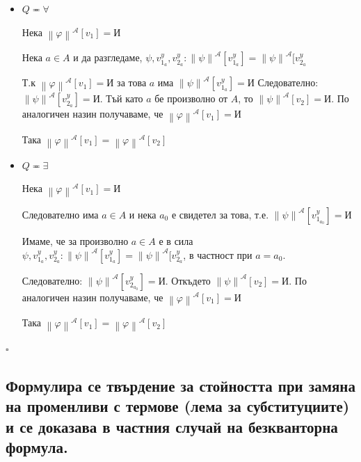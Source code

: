 \documentclass{article}
\renewcommand{\\}{\newline}
\newcommand{\I}{\text{И}}
\newcommand{\proven}{\hfill $\square$}
\begin{document}
\begin{itemize}
    \item \(Q \eqcirc \forall\) 

      Нека \(\left\|\varphi\right\|^{\mathcal{A}}[v_1] = \I\) 

      Нека \(a \in A\) и да разгледаме, \(\psi, v_{1_a}^{y}, v_{2_a}^{y}: \left\|\psi\right\|^{\mathcal{A}}[v_{1_a}^{y}] = \left\|\psi\right\|^{\mathcal{A}}[v_{2_a}^{y}\)   

      Т.к \(\left\|\varphi\right\|^{\mathcal{A}}[v_1] = \I\) за това \(a\) има \(\left\|\psi\right\|^{\mathcal{A}}[v_{1_a}^{y}] =\I\) 
      Следователно: \(\left\|\psi\right\|^{\mathcal{A}}[v_{2_a}^{y}] =\I\). Тъй като \(a\) бе произволно от \(A\), то \(\left\|\psi\right\|^{\mathcal{A}}[v_2] = \I\). По аналогичен назин получаваме, че \(\left\|\varphi\right\|^{\mathcal{A}}[v_1] = \I\)

      Така \(\left\|\varphi\right\|^{\mathcal{A}}[v_1] = \left\|\varphi\right\|^{\mathcal{A}}[v_2]\)  



    \item \(Q \eqcirc \exists\)  

      Нека \(\left\|\varphi\right\|^{\mathcal{A}}[v_1] = \I\) 

      Следователно има \(a \in A\) и нека \(a_0\) е свидетел за това, т.е. \(\left\|\psi\right\|^{\mathcal{A}}[v_{1_{a_0}}^{y}] =\I\)

      Имаме, че за произволно \(a \in A\) е в сила \(\psi, v_{1_a}^{y}, v_{2_a}^{y}: \left\|\psi\right\|^{\mathcal{A}}[v_{1_a}^{y}] = \left\|\psi\right\|^{\mathcal{A}}[v_{2_a}^{y}\), в частност при \(a = a_0\).  

      Следователно: \(\left\|\psi\right\|^{\mathcal{A}}[v_{2_{a_0}}^{y}] =\I\). Откъдето \(\left\|\psi\right\|^{\mathcal{A}}[v_2] = \I\). По аналогичен назин получаваме, че \(\left\|\varphi\right\|^{\mathcal{A}}[v_1] = \I\)  

      Така \(\left\|\varphi\right\|^{\mathcal{A}}[v_1] = \left\|\varphi\right\|^{\mathcal{A}}[v_2]\)  

\end{itemize} \proven

\subsection{Формулира се твърдение за стойността при замяна на променливи с термове (лема за субституциите) и се доказава в частния случай на безкванторна формула.}
\end{document}
